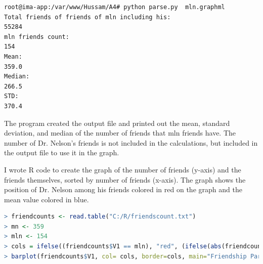 \documentclass[a4paper, 11pt]{article}
\begin{document}
\begin{lstlisting}[language=bash, breakatwhitespace=〈false), label=running parse.py, caption= Running parse.py to capture the number of friends for each friend of Dr. Nelson]
root@ima-app:/var/www/Hussam/A4# python parse.py  mln.graphml
Total friends of friends of mln including his:
55284
mln friends count:
154
Mean:
359.0
Median:
266.5
STD:
370.4
\end{lstlisting}

The program created the output file and printed out the mean, standard deviation, and median of the number of friends that mln friends have. The number of Dr. Nelson's friends is not included in the calculations, but included in the output file to use it in the graph.

I wrote R code to create the graph of the number of friends (y-axis) and the friends themselves, sorted by number of friends (x-axis). The graph shows the position of Dr. Nelson among his friends colored in red on the graph and the mean value colored in blue.  

\begin{lstlisting}[language=R, breakatwhitespace=〈false), label=Friendship Paradox graph code in R, caption= Friendship Paradox graph code in R]
> friendcounts <- read.table("C:/R/friendscount.txt")
> mn <- 359
> mln <- 154
> cols = ifelse((friendcounts$V1 == mln), "red", (ifelse(abs(friendcounts$V1 == mn), "blue" , "orange")))
> barplot(friendcounts$V1, col= cols, border=cols, main="Friendship Paradox", xlab="Friends", ylab = "Number of Friends")
\end{lstlisting}
\end{document}
